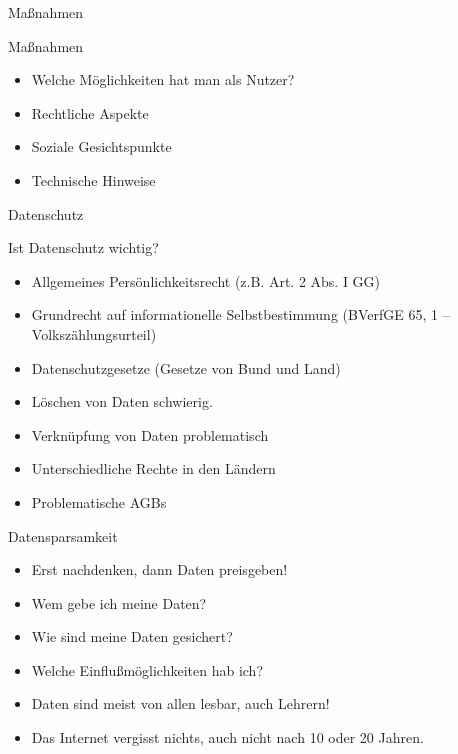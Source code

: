 \begin{frame}
Maßnahmen
\end{frame}

\begin{frame}{Maßnahmen}
	\begin{itemize}
		\item Welche M\"oglichkeiten hat man als Nutzer?
		\item Rechtliche Aspekte
		\item Soziale Gesichtspunkte
		\item Technische Hinweise
	\end{itemize}
\end{frame}

\begin{frame}{Datenschutz}
	\begin{center}Ist Datenschutz wichtig?
	\end{center}
	\begin{itemize}
		\item Allgemeines Pers\"onlichkeitsrecht (z.B. Art. 2 Abs. I GG)
		\item Grundrecht auf informationelle Selbstbestimmung (BVerfGE 65, 1 –Volksz\"ahlungsurteil)
		\item Datenschutzgesetze (Gesetze von Bund und Land)
	\end{itemize}
	\begin{itemize}
		\item L\"oschen von Daten schwierig.
		\item Verkn\"upfung von Daten problematisch
		\item Unterschiedliche Rechte in den L\"andern
		\item Problematische AGBs
	\end{itemize}
\end{frame}

\begin{frame}{Datensparsamkeit}
	\begin{itemize}
		\item Erst nachdenken, dann Daten preisgeben!
		\item Wem gebe ich meine Daten?
		\item Wie sind meine Daten gesichert?
		\item Welche Einflu\ss m\"oglichkeiten hab ich?
		\item Daten sind meist von allen lesbar, auch Lehrern!
		\item Das Internet vergisst nichts, auch nicht nach 10 oder 20 Jahren.
	\end{itemize}
\end{frame}

